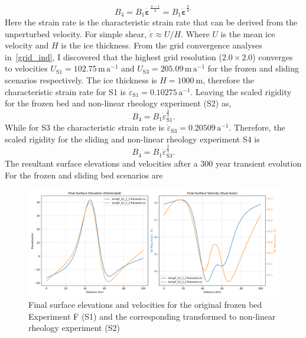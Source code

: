 \begin{equation}
B_4 = B_1 \mathbf{\dot{\varepsilon}}^{\frac{4-1}{4}} = B_1 \mathbf{\dot{\varepsilon}}^{\frac{3}{4},}
\end{equation}
Here the strain rate is the characteristic strain rate that can be derived from the unperturbed velocity. For simple shear, $\dot{\varepsilon} \approx U / H$. Where $U$ is the mean ice velocity and $H$ is the ice thickness. 
From the grid convergence analyses in~\ref{grid_ind}, I discovered that the highest grid resolution ($2.0\times2.0$) converges to velocities $U_{\mathrm{S1}}=102.75 \, \mathrm{m\,a^{-1}}$ and $U_{\mathrm{S3}}=205.09 \, \mathrm{m\,a^{-1}}$ for the frozen and sliding scenarios respectively. The ice thickness is $H=1000~\mathrm{m}$, therefore the characteristic strain rate for S1 is $\dot{\varepsilon}_{\mathrm{S1}}=  0.10275\,\mathrm{a^{-1}}$. Leaving the scaled rigidity for the frozen bed and non-linear rheology experiment (S2) as, 
\begin{equation}
B_4 = B_1 \dot{\varepsilon}_{\mathrm{S1}}^{\frac{3}{4}}.
\end{equation}
While for S3 the characteristic strain rate is $\dot{\varepsilon}_{\mathrm{S3}}= 0.20509 \,\mathrm{a^{-1}}.$ Therefore, the scaled rigidity for the sliding and non-linear rheology experiment S4 is
\begin{equation}
B_4 = B_1 \dot{\varepsilon}_{\mathrm{S3}}^{\frac{3}{4}}.
\end{equation}
The resultant surface elevations and velocities after a 300 year transient evolution For the frozen and sliding bed scenarios are 
\begin{figure}[H]
    \includegraphics[scale=0.40]{figures/combined_elevation_detrended_surface_velocity_['S1']_['S2'].png}
    \caption{Final surface elevations and velocities for the original frozen bed Experiment F (S1) and the corresponding transformed to non-linear rheology experiment (S2)}
    \label{fig:elev_vel_S1_S2}
\end{figure}
